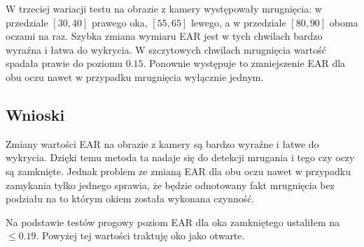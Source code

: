 W trzeciej wariacji testu na obrazie z kamery występowały mrugnięcia: w przedziale $[30,40]$ prawego oka, $[55,65]$ lewego, a w przedziale $[80,90]$ oboma oczami na raz. Szybka zmiana wymiaru EAR jest w tych chwilach bardzo wyraźna i łatwa do wykrycia. W szczytowych chwilach mrugnięcia wartość spadała prawie do poziomu $0.15$. Ponownie występuje to zmniejszenie EAR dla obu oczu nawet w przypadku mrugnięcia wyłącznie jednym. 


\subsection{Wnioski}

Zmiany wartości EAR na obrazie z kamery są bardzo wyraźne i łatwe do wykrycia. Dzięki temu metoda ta nadaje się do detekcji mrugania i tego czy oczy są zamknięte. Jednak problem ze zmianą EAR dla obu oczu nawet w przypadku zamykania tylko jednego sprawia, że będzie odnotowany fakt mrugnięcia bez podziału na to którym okiem została wykonana czynność.
\par
Na podstawie testów progowy poziom EAR dla oka zamkniętego ustaliłem na $\leq0.19$. Powyżej tej wartości traktuję oko jako otwarte. 
